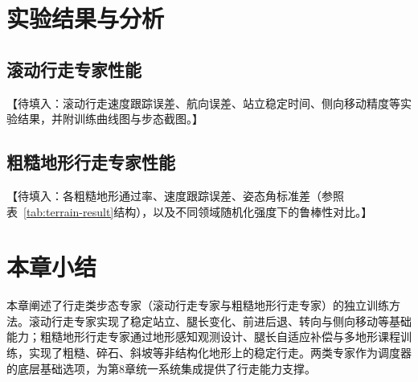 \section{实验结果与分析}

\subsection{滚动行走专家性能}

【待填入：滚动行走速度跟踪误差、航向误差、站立稳定时间、侧向移动精度等实验结果，并附训练曲线图与步态截图。】

\subsection{粗糙地形行走专家性能}

【待填入：各粗糙地形通过率、速度跟踪误差、姿态角标准差（参照表~\ref{tab:terrain-result}结构），以及不同领域随机化强度下的鲁棒性对比。】

\begin{table}[!htbp]
    \centering
    \label{tab:terrain-result}
\end{table}

\section{本章小结}

本章阐述了行走类步态专家（滚动行走专家与粗糙地形行走专家）的独立训练方法。滚动行走专家实现了稳定站立、腿长变化、前进后退、转向与侧向移动等基础能力；粗糙地形行走专家通过地形感知观测设计、腿长自适应补偿与多地形课程训练，实现了粗糙、碎石、斜坡等非结构化地形上的稳定行走。两类专家作为调度器的底层基础选项，为第8章统一系统集成提供了行走能力支撑。
